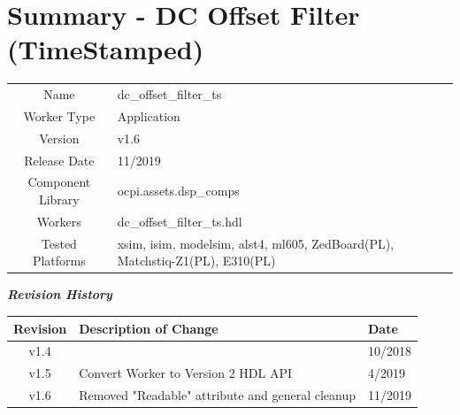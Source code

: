 \documentclass{article}
\author{} %
\date{Version \docVersion} %
\title{\docTitle}
\def\docVersion{1.6}
\def\comp{dc\_offset\_filter\_ts}
\def\Comp{DC Offset Filter (TimeStamped)}
\begin{document}
\section*{Summary - \Comp}
\begin{tabular}{|c|M{13.5cm}|}
	\hline
	                  &                                                    \\
	\hline
	Name              & \comp                                              \\
	\hline
	Worker Type       & Application                                        \\
	\hline
	Version           & v\docVersion \\
	\hline
	Release Date      & 11/2019 \\
	\hline
	Component Library & ocpi.assets.dsp\_comps                              \\
	\hline
	Workers           & \comp.hdl                                          \\
	\hline
	Tested Platforms  & xsim, isim, modelsim, alst4, ml605, ZedBoard(PL), Matchstiq-Z1(PL), E310(PL)\\
	\hline
\end{tabular}

\begin{center}
	\textit{\textbf{Revision History}}
	\begin{table}[H]
	\label{table:revisions} %
		\begin{tabularx}{\textwidth}{|c|X|l|}
		\hline
		\rowcolor{blue}
		\textbf{Revision} & \textbf{Description of Change} & \textbf{Date} \\
		\hline
		v1.4 & & 10/2018 \\
		\hline
		v1.5 & Convert Worker to Version 2 HDL API & 4/2019\\
		\hline
		v1.6 & Removed "Readable" attribute and general cleanup & 11/2019\\
		\hline
		\end{tabularx}
	\end{table}
\end{center}
\end{document}
